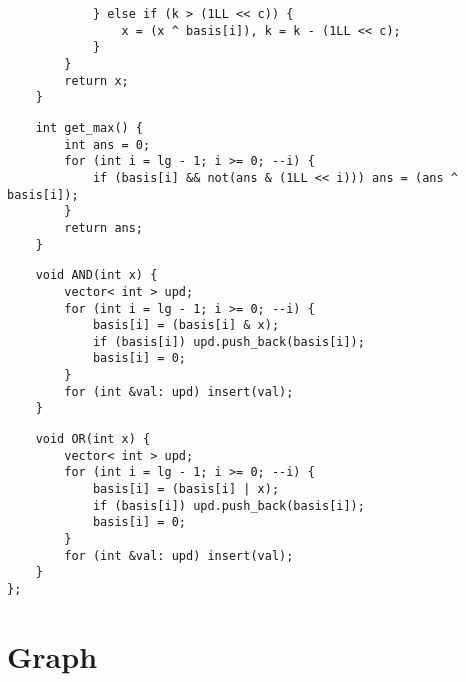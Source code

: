 \documentclass[twoside]{article}
\begin{document}
\begin{multicols*}{2}
\begin{verbatim}
            } else if (k > (1LL << c)) {
                x = (x ^ basis[i]), k = k - (1LL << c);
            }
        }
        return x;
    }
\end{verbatim}
\vspace{-12pt}
\begin{verbatim}
    int get_max() {
        int ans = 0;
        for (int i = lg - 1; i >= 0; --i) {
            if (basis[i] && not(ans & (1LL << i))) ans = (ans ^ basis[i]);
        }
        return ans;
    }
\end{verbatim}
\vspace{-12pt}
\begin{verbatim}
    void AND(int x) {
        vector< int > upd;
        for (int i = lg - 1; i >= 0; --i) {
            basis[i] = (basis[i] & x);
            if (basis[i]) upd.push_back(basis[i]);
            basis[i] = 0;
        }
        for (int &val: upd) insert(val);
    }
\end{verbatim}
\vspace{-12pt}
\begin{verbatim}
    void OR(int x) {
        vector< int > upd;
        for (int i = lg - 1; i >= 0; --i) {
            basis[i] = (basis[i] | x);
            if (basis[i]) upd.push_back(basis[i]);
            basis[i] = 0;
        }
        for (int &val: upd) insert(val);
    }
};

\end{verbatim}

{
\section*{Graph}
}
{
}
\end{multicols*}
\end{document}
